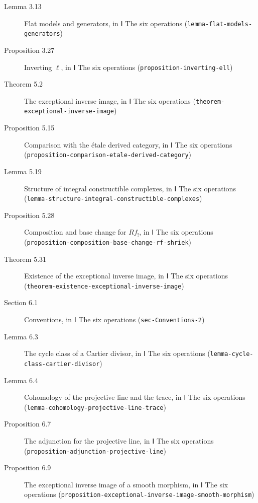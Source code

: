 \documentclass[11pt]{article}
\newcommand{\bpslug}[1]{\texttt{#1}}
\begin{document}
\begin{description}
\item[Lemma 3.13] Flat models and generators, in Ⅰ The six operations (\bpslug{lemma-{}\allowbreak{}flat-{}\allowbreak{}models-{}\allowbreak{}generators})
\item[Proposition 3.27] Inverting $\ell$, in Ⅰ The six operations (\bpslug{proposition-{}\allowbreak{}inverting-{}\allowbreak{}ell})
\item[Theorem 5.2] The exceptional inverse image, in Ⅰ The six operations (\bpslug{theorem-{}\allowbreak{}exceptional-{}\allowbreak{}inverse-{}\allowbreak{}image})
\item[Proposition 5.15] Comparison with the étale derived category, in Ⅰ The six operations (\bpslug{proposition-{}\allowbreak{}comparison-{}\allowbreak{}etale-{}\allowbreak{}derived-{}\allowbreak{}category})
\item[Lemma 5.19] Structure of integral constructible complexes, in Ⅰ The six operations (\bpslug{lemma-{}\allowbreak{}structure-{}\allowbreak{}integral-{}\allowbreak{}constructible-{}\allowbreak{}complexes})
\item[Proposition 5.28] Composition and base change for $Rf_!$, in Ⅰ The six operations (\bpslug{proposition-{}\allowbreak{}composition-{}\allowbreak{}base-{}\allowbreak{}change-{}\allowbreak{}rf-{}\allowbreak{}shriek})
\item[Theorem 5.31] Existence of the exceptional inverse image, in Ⅰ The six operations (\bpslug{theorem-{}\allowbreak{}existence-{}\allowbreak{}exceptional-{}\allowbreak{}inverse-{}\allowbreak{}image})
\item[Section 6.1] Conventions, in Ⅰ The six operations (\bpslug{sec-{}\allowbreak{}Conventions-{}\allowbreak{}2})
\item[Lemma 6.3] The cycle class of a Cartier divisor, in Ⅰ The six operations (\bpslug{lemma-{}\allowbreak{}cycle-{}\allowbreak{}class-{}\allowbreak{}cartier-{}\allowbreak{}divisor})
\item[Lemma 6.4] Cohomology of the projective line and the trace, in Ⅰ The six operations (\bpslug{lemma-{}\allowbreak{}cohomology-{}\allowbreak{}projective-{}\allowbreak{}line-{}\allowbreak{}trace})
\item[Proposition 6.7] The adjunction for the projective line, in Ⅰ The six operations (\bpslug{proposition-{}\allowbreak{}adjunction-{}\allowbreak{}projective-{}\allowbreak{}line})
\item[Proposition 6.9] The exceptional inverse image of a smooth morphism, in Ⅰ The six operations (\bpslug{proposition-{}\allowbreak{}exceptional-{}\allowbreak{}inverse-{}\allowbreak{}image-{}\allowbreak{}smooth-{}\allowbreak{}morphism})

\end{description}
\end{document}
